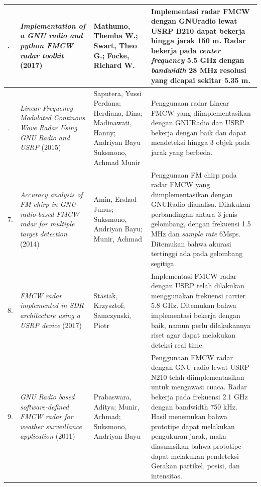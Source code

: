 \begin{center}
\begin{longtable}{|>{\centering\arraybackslash}p{0.6cm}|p{4cm}|p{3cm}|p{5cm}|}
	5. & \textit{Implementation of a GNU radio and python FMCW radar toolkit } (2017)
	& Mathumo, Themba W.; Swart, Theo G.; Focke, Richard W.
	& Implementasi radar FMCW dengan GNUradio lewat USRP B210 dapat bekerja hingga jarak 150 m. Radar bekerja pada \textit{center frequency} 5.5 GHz dengan \textit{bandwidth} 28 MHz resolusi yang dicapai sekitar 5.35 m. \\ \hline
	
	6. & \textit{Linear Frequency Modulated Continous Wave Radar Using GNU Radio and USRP} (2015)
	& Saputera, Yussi Perdana; Herdiana, Dina; Madinawati, Hanny; Andriyan Bayu Suksmono, Achmad Munir
	& Penggunaan radar Linear FMCW yang diimplementasikan dengan GNURadio dan USRP bekerja dengan baik dan dapat mendeteksi hingga 3 objek pada jarak yang berbeda. \\ \hline
	
	7. & \textit{Accuracy analysis of FM chirp in GNU radio-based FMCW radar for multiple target detection} (2014)
	& Amin, Ershad Junus; Suksmono, Andriyan Bayu; Munir, Achmad
	& Penggunaan FM chirp pada radar FMCW yang diimplementasikan dengan GNURadio dianalisa. Dilakukan perbandingan antara 3 jenis gelombang, dengan frekuensi 1.5 MHz dan \textit{sample rate} 6Msps. Ditemukan bahwa akurasi tertinggi ada pada gelombang segitiga. \\ \hline
	
	8. & \textit{FMCW radar implemented in SDR architecture using a USRP device} (2017)
	& Stasiak, Krzysztof; Samczynski, Piotr
	& Implementasi FMCW radar dengan USRP telah dilakukan menggunakan frekuensi carrier 5.8 GHz. Ditemukan bahwa implementasi bekerja dengan baik, namun perlu dilakukannya riset agar dapat melakukan deteksi real time. \\ \hline
	
	9. & \textit{GNU Radio based software-defined FMCW radar for weather surveillance application} (2011)
	& Prabaswara, Aditya; Munir, Achmad; Suksmono, Andriyan Bayu
	& Penggunaan FMCW radar dengan GNU radio lewat USRP N210 telah diimplementasikan untuk mengawasi cuaca. Radar bekerja pada frekuensi 2.1 GHz dengan bandwidth 750 kHz. Hasil menemukan bahwa prototipe dapat melakukan pengukuran jarak, maka diasumsikan bahwa prototipe dapat melakukan pendeteksi Gerakan partikel, posisi, dan intensitas. \\ \hline
	\end{longtable}
\end{center}

